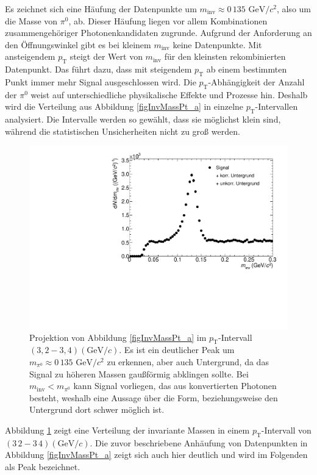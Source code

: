 Es zeichnet sich eine Häufung der Datenpunkte um $m_{\text{inv}}\approx 0\,135\text{ GeV}/c^{2}$, also um die Masse von $\pi^{0}$, ab.
Dieser Häufung liegen vor allem Kombinationen zusammengehöriger Photonenkandidaten zugrunde.
Aufgrund der Anforderung an den Öffnungswinkel gibt es bei kleinem $m_{\text{inv}}$ keine Datenpunkte.
Mit ansteigendem $p_{\text{T}}$ steigt der Wert von $m_{\text{inv}}$ für den kleinsten rekombinierten Datenpunkt.
Das führt dazu, dass mit steigendem $p_{\text{T}}$ ab einem bestimmten Punkt immer mehr Signal ausgeschlossen wird.
\newline
Die $p_{\text{T}}$-Abhängigkeit der Anzahl der $\pi^{0}$ weist auf unterschiedliche physikalische Effekte und Prozesse hin.
Deshalb wird die Verteilung aus Abbildung \ref{figInvMassPt_a} in einzelne $p_{\text{T}}$-Intervallen analysiert.
Die Intervalle werden so gewählt, dass sie möglichst klein sind, während die statistischen Unsicherheiten nicht zu groß werden.
\begin{figure}[tbp]
\centering
\includegraphics[width=.75\linewidth]{hSignalPlusBkg.pdf}
\caption{Projektion von Abbildung \ref{figInvMassPt_a} im $p_{\text{T}}$-Intervall $(3,2 - 3,4) (\text{GeV/}c)$. Es ist ein deutlicher Peak um $m_{\pi^{0}} \approx 0\,135\text{ GeV/}c^{2}$ zu erkennen, aber auch Untergrund, da das Signal zu höheren Massen gaußförmig abklingen sollte. Bei $m_{\text{inv}} < m_{\pi^{0}}$ kann Signal vorliegen, das aus konvertierten Photonen besteht, weshalb eine Aussage über die Form, beziehungsweise den Untergrund dort schwer möglich ist.}
\label{figSignalPlusBkg}
\end{figure}
\newline
Abbildung \ref{figSignalPlusBkg} zeigt eine Verteilung der invariante Massen in einem $p_{\text{T}}$-Intervall von $(3\,2 - 3\,4)(\text{GeV}/c)$.
Die zuvor beschriebene Anhäufung von Datenpunkten in Abbildung \ref{figInvMassPt_a} zeigt sich auch hier deutlich und wird im Folgenden als Peak bezeichnet.
